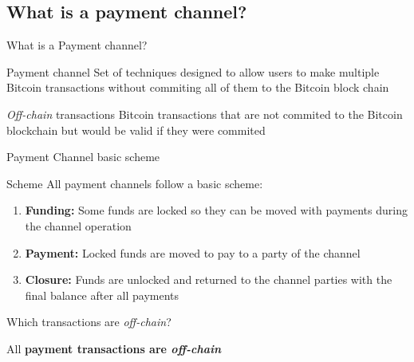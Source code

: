 \documentclass{beamer}
\begin{document}
\subsection{What is a payment channel?}
\begin{frame}{What is a Payment channel?}
 \begin{block}{Payment channel}
  Set of techniques designed to allow users to make multiple Bitcoin transactions without commiting all of them to the Bitcoin block chain
 \end{block}
 \begin{block}{\textit{Off-chain} transactions}
  Bitcoin transactions that are not commited to the Bitcoin blockchain but would be valid if they were commited
 \end{block}
\end{frame}
\begin{frame}{Payment Channel basic scheme}
 \begin{block}{Scheme}
  All payment channels follow a basic scheme:
  \begin{enumerate}
   \item \textbf{Funding:} Some funds are locked so they can be moved with payments during the channel operation
   \item \textbf{Payment:} Locked funds are moved to pay to a party of the channel
   \item \textbf{Closure:} Funds are unlocked and returned to the channel parties with the final balance after all payments
  \end{enumerate}
 \end{block}
 \begin{block}{Which transactions are \textit{off-chain}?}
  \begin{center}
   All \textbf{payment transactions are \textit{off-chain}}
  \end{center}
 \end{block}
\end{frame}
\end{document}
